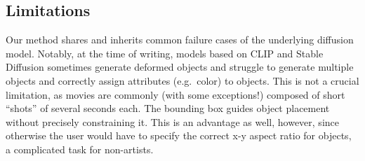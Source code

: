 \subsection{Limitations}
\label{ssec:limits}
Our method shares and inherits  common failure cases of the underlying diffusion model. Notably, at the time of writing, models based on CLIP and Stable Diffusion sometimes generate deformed objects and struggle to generate multiple objects and correctly assign attributes (e.g.~color) to objects. 
This is not a crucial limitation, as movies are commonly (with some exceptions!) composed of short ``shots'' of several seconds each.  The bounding box guides object placement without precisely constraining it. This is an advantage as well, however, since otherwise the user would have to specify the correct x-y aspect ratio for objects, a complicated task for non-artists.


